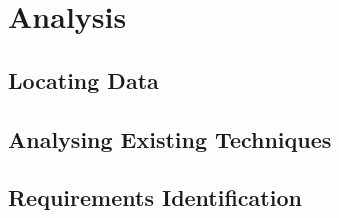 
\chapter{Analysis}

\section{Locating Data}

\section{Analysing Existing Techniques}


\section{Requirements Identification}

